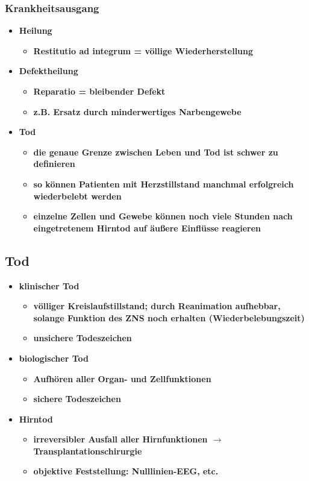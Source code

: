 \subsubsection{Krankheitsausgang}
	\begin{itemize}
		\item \textbf{Heilung}
			\begin{itemize}
				\item \textbf{Restitutio ad integrum = völlige Wiederherstellung}
			\end{itemize}
		\item \textbf{Defektheilung}
			\begin{itemize}
				\item \textbf{Reparatio = bleibender Defekt}
				\item \textbf{z.B. Ersatz durch minderwertiges Narbengewebe}
			\end{itemize}
		\item \textbf{Tod}
			\begin{itemize}
				\item \textbf{die genaue Grenze zwischen Leben und Tod ist schwer zu definieren}
				\item \textbf{so können Patienten mit Herzstillstand manchmal erfolgreich wiederbelebt werden}
				\item \textbf{einzelne Zellen und Gewebe können noch viele Stunden nach eingetretenem Hirntod auf äußere Einflüsse reagieren}
			\end{itemize}
	\end{itemize}

\subsection{Tod}
	\begin{itemize}
		\item \textbf{klinischer Tod}
			\begin{itemize}
				\item \textbf{völliger Kreislaufstillstand; durch Reanimation aufhebbar, solange Funktion des ZNS noch erhalten (Wiederbelebungszeit)}
				\item \textbf{unsichere Todeszeichen}
			\end{itemize}
		\item \textbf{biologischer Tod}
			\begin{itemize}
				\item \textbf{Aufhören aller Organ- und Zellfunktionen}
				\item \textbf{sichere Todeszeichen}
			\end{itemize}
		\item \textbf{Hirntod}
			\begin{itemize}
				\item \textbf{irreversibler Ausfall aller Hirnfunktionen  $\rightarrow$  Transplantationschirurgie}
				\item \textbf{objektive Feststellung: Nulllinien-EEG, etc.}
			\end{itemize}
	\end{itemize}

